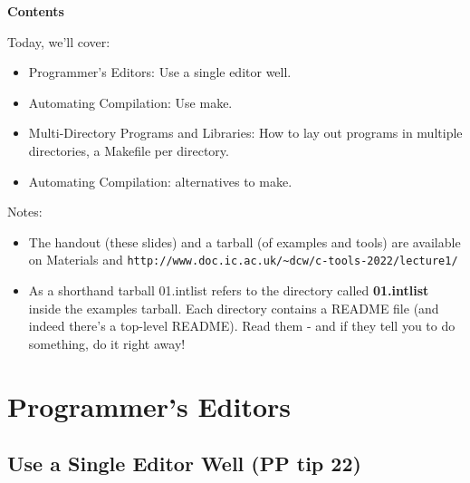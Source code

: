 \documentclass[handout]{beamer}
\newcommand\myheading[1]{%
  \par\bigskip
  {\Large\bfseries#1}\par\smallskip}
\begin{document}
\begin{frame}[fragile]
  \myheading{Contents}
  Today, we'll cover:
      \begin{itemize}
        \item
          \alert{Programmer's Editors:} Use a single editor well.
        \item
	  \alert{Automating Compilation:} Use make.
        \item
   	  \alert{Multi-Directory Programs and Libraries:} How to lay out
	  programs in multiple directories, a Makefile per directory.
        \item
	  \alert{Automating Compilation:} alternatives to make.
	\end{itemize}
    \pause

    Notes:


    \begin{itemize}
    \item
    The handout (these slides) and a tarball (of examples and tools) are available on Materials and
    \verb+http://www.doc.ic.ac.uk/~dcw/c-tools-2022/lecture1/+

    \item
    As a shorthand \alert{tarball 01.intlist} refers to the directory
    called {\bf 01.intlist} inside the examples tarball.
    Each directory contains a README file (and indeed there's a top-level README).
    Read them - and if they tell you to do something, do it right away!
    \end{itemize}

\end{frame}



\section{Programmer's Editors}
\subsection{Use a Single Editor Well (PP tip 22)}
\end{document}
